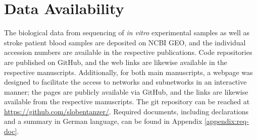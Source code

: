 \chapter*{Data Availability}
The biological data from sequencing of \emph{in vitro} experimental samples as well as stroke patient blood samples are deposited on NCBI GEO, and the individual accession numbers are available in the respective publications.\cite{Lobentanzer2019a,Winek2020} Code repositories are published on GitHub, and the web links are likewise available in the respective manuscripts. Additionally, for both main manuscripts, a webpage was designed to facilitate the access to networks and subnetworks in an interactive manner; the pages are publicly available via GitHub, and the links are likewise available from the respective manuscripts. The git repository can be reached at \url{https://github.com/slobentanzer/}. Required documents, including declarations and a summary in German language, can be found in Appendix \ref{appendix:req-doc}.